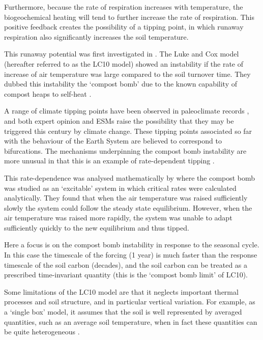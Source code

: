 Furthermore, because the rate of respiration increases with temperature, the biogeochemical heating will tend to
further increase the rate of respiration. This positive feedback creates the possibility of a tipping point, in which
runaway respiration also significantly increases the soil temperature.

This runaway potential was first investigated in \cite{Luke2011}. The Luke and Cox model (hereafter referred to as the LC10 model)
showed an instability if the rate of increase of air temperature was large compared to the soil turnover time. They dubbed this instability
the `compost bomb' due to the known capability of compost heaps to self-heat \parencite{Nelson2007,Sidhu2007,Browne1929}.

A range of climate tipping points have been observed in
paleoclimate records \parencite{Alley2003}, and both expert opinion \parencite{Lenton2008} and ESMs \parencite{Drijfhout2015} raise the possibility that they may be triggered this century by climate change.
These tipping points associated so far with the behaviour of the Earth System are believed to
correspond to bifurcations. The mechanisms underpinning the compost bomb instability are more unusual in that this is an example of rate-dependent tipping \parencite{Ashwin2012}.

This rate-dependence was analysed mathematically
by \parencite{Wieczorek2011} where the compost bomb was studied as an `excitable' system in which critical rates
were calculated analytically. They found that when the air temperature was
raised sufficiently slowly the system could follow the steady state equilibrium. However, when the air temperature was raised more rapidly,
the system was unable to adapt sufficiently quickly to the new equilibrium and thus tipped.

Here a focus is on the compost bomb instability in response to the seasonal cycle. In this case the timescale of the forcing (1 year) is much faster than the response timescale of the soil carbon
(decades), and the soil carbon can be treated as a prescribed time-invariant quantity (this is the `compost bomb limit' of LC10). 

Some limitations of the LC10 model are that it neglects important thermal processes and soil structure, and in particular vertical variation.
For example, as a `single box' model, it assumes that the soil is well represented by averaged quantities, such as an average soil temperature,
when in fact these quantities can be quite heterogeneous \parencite{Gedney2003}.


